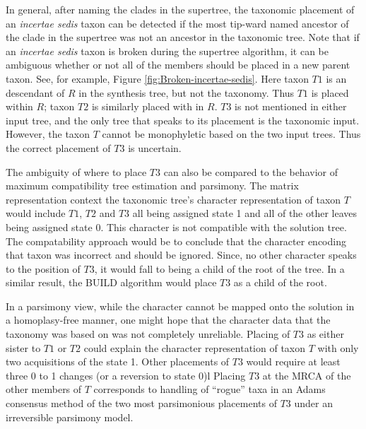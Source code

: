\documentclass[english]{article}
\begin{document}
In general, after naming the clades in the supertree, the
    taxonomic placement of an \emph{incertae sedis} taxon
    can be detected if the most tip-ward named ancestor of
    the clade in the supertree was not an ancestor in the
    taxonomic tree.
Note that if an \emph{incertae sedis} taxon is broken
    during the supertree algorithm, it can be ambiguous whether
    or not all of the members should be placed in a new
    parent taxon.
See, for example, Figure \ref{fig:Broken-incertae-sedis}.
Here taxon $T1$ is an descendant of $R$ in the
synthesis tree, but not the taxonomy.
Thus $T1$ is placed within $R$; taxon
 $T2$ is similarly placed with in $R$.
$T3$ is not mentioned in either input tree, and the 
    only tree that speaks to its placement is the taxonomic input.
However, the taxon $T$ cannot be monophyletic based on the
     two input trees.
Thus the correct placement of $T3$ is uncertain.

The ambiguity of where to place $T3$ can also be compared to the
    behavior of maximum compatibility tree estimation and parsimony.
The matrix representation context the taxonomic tree's
    character representation of taxon $T$ would include $T1$, $T2$ and $T3$
    all being assigned state 1 and all of the other leaves being assigned 
    state 0.
This character is not compatible with the solution tree. 
The compatability approach would be to conclude that the character encoding 
    that taxon was incorrect and should be ignored.
Since, no other character speaks to the position of $T3$, it would fall to being
    a child of the root of the tree.
In a similar result, the BUILD algorithm would place $T3$ as a child of the root.

In a parsimony view, while the character cannot be mapped onto the solution in
    a homoplasy-free manner, one might hope that the character data that the
    taxonomy was based on was not completely unreliable.
Placing of $T3$ as either sister to $T1$ or $T2$ could explain the character
    representation of taxon $T$ with only two acquisitions of the state 1.
Other placements of $T3$ would require at least three 0 to 1 changes (or a reversion
    to state 0)l
Placing $T3$ at the MRCA 
    of the other members of $T$ corresponds
    to handling of ``rogue'' taxa in an Adams consensus method of the two
    most parsimonious placements of $T3$ under an irreversible parsimony model.



\end{document}
